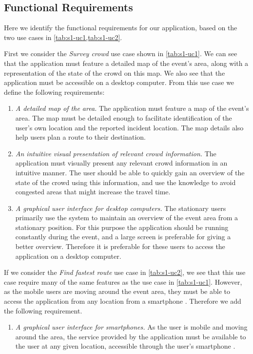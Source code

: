 \subsection{Functional Requirements} \label{ss:s1_freqs}
Here we identify the functional requirements for our application, based on the two use cases in \cref{tab:s1-uc1,tab:s1-uc2}. 

First we consider the \emph{Survey crowd} use case shown in \cref{tab:s1-uc1}. We can see that the application must feature a detailed map of the event's area, along with a representation of the state of the crowd on this map. We also see that the application must be accessible on a desktop computer. From this use case we define the following requirements:

\begin{enumerate}
    \item \emph{A detailed map of the area.} The application must feature a map of the event's area. The map must be detailed enough to facilitate identification of the user's own location and the reported incident location. The map details also help users plan a route to their destination.
    \item \emph{An intuitive visual presentation of relevant crowd information.} The application must visually present any relevant crowd information in an intuitive manner. The user should be able to quickly gain an overview of the state of the crowd using this information, and use the knowledge to avoid congested areas that might increase the travel time.
    \item \emph{A graphical user interface for desktop computers.} The stationary users primarily use the system to maintain an overview of the event area from a stationary position. For this purpose the application should be running constantly during the event, and a large screen is preferable for giving a better overview. Therefore it is preferable for these users to access the application on a desktop computer.
\end{enumerate}

If we consider the \emph{Find fastest route} use case in \cref{tab:s1-uc2}, we see that this use case require many of the same features as the use case in \cref{tab:s1-uc1}. However, as the mobile users are moving around the event area, they must be able to access the application from any location from a smartphone . Therefore we add the following requirement.

\begin{enumerate}[resume]
    \item \emph{A graphical user interface for smartphones.} As the user is mobile and moving around the area, the service provided by the application must be available to the user at any given location, accessible through the user's smartphone .

\end{enumerate}

